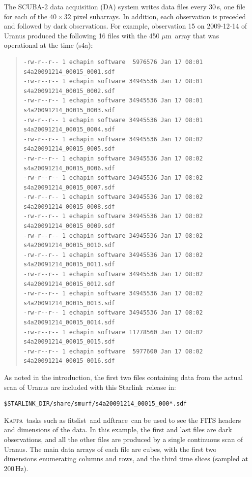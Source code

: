 \documentclass[twoside,11pt]{article}
\newcommand{\micron}{\mbox{\,${\mu}$m}}            %
\newenvironment{myquote}{\begin{quote}\begin{small}}{\end{small}\end{quote}}
\newcommand{\starlink}{\htmladdnormallink{Starlink}{http://starlink.jach.hawaii.edu}}
\newcommand{\Kappa}{\xref{\textsc{Kappa}}{sun95}{}}
\newcommand{\task}[1]{\textsf{#1}}
\newcommand{\fitslist}{\xref{\task{fitslist}}{sun95}{FITSLIST}}
\newcommand{\ndftrace}{\xref{\task{ndftrace}}{sun95}{NDFTRACE}}
\newcommand{\htmladdnormallink}[2]{#1}
\newcommand{\xref}[3]{#1}
\renewcommand{\_}{\texttt{\symbol{95}}}
\begin{document}
The SCUBA-2 data acquisition (DA) system writes data files every
30\,s, one file for each of the $40\times32$ pixel subarrays. In
addition, each observation is preceded and followed by dark
observations. For example, observation 15 on 2009-12-14 of Uranus
produced the following 16 files with the 450\,\micron\ array that was
operational at the time (s4a):

\begin{myquote}
\begin{verbatim}
-rw-r--r-- 1 echapin software  5976576 Jan 17 08:01 s4a20091214_00015_0001.sdf
-rw-r--r-- 1 echapin software 34945536 Jan 17 08:01 s4a20091214_00015_0002.sdf
-rw-r--r-- 1 echapin software 34945536 Jan 17 08:01 s4a20091214_00015_0003.sdf
-rw-r--r-- 1 echapin software 34945536 Jan 17 08:01 s4a20091214_00015_0004.sdf
-rw-r--r-- 1 echapin software 34945536 Jan 17 08:02 s4a20091214_00015_0005.sdf
-rw-r--r-- 1 echapin software 34945536 Jan 17 08:02 s4a20091214_00015_0006.sdf
-rw-r--r-- 1 echapin software 34945536 Jan 17 08:02 s4a20091214_00015_0007.sdf
-rw-r--r-- 1 echapin software 34945536 Jan 17 08:02 s4a20091214_00015_0008.sdf
-rw-r--r-- 1 echapin software 34945536 Jan 17 08:02 s4a20091214_00015_0009.sdf
-rw-r--r-- 1 echapin software 34945536 Jan 17 08:02 s4a20091214_00015_0010.sdf
-rw-r--r-- 1 echapin software 34945536 Jan 17 08:02 s4a20091214_00015_0011.sdf
-rw-r--r-- 1 echapin software 34945536 Jan 17 08:02 s4a20091214_00015_0012.sdf
-rw-r--r-- 1 echapin software 34945536 Jan 17 08:02 s4a20091214_00015_0013.sdf
-rw-r--r-- 1 echapin software 34945536 Jan 17 08:02 s4a20091214_00015_0014.sdf
-rw-r--r-- 1 echapin software 11778560 Jan 17 08:02 s4a20091214_00015_0015.sdf
-rw-r--r-- 1 echapin software  5977600 Jan 17 08:02 s4a20091214_00015_0016.sdf
\end{verbatim}
\end{myquote}

As noted in the introduction, the first two files containing data from
the actual scan of Uranus are included with this \starlink\ release in:
\begin{verbatim}
$STARLINK_DIR/share/smurf/s4a20091214_00015_000*.sdf
\end{verbatim}

\Kappa\ tasks such as \fitslist\ and \ndftrace\ can be used to see the
FITS headers and dimensions of the data. In this example, the first
and last files are dark observations, and all the other files are
produced by a single continuous scan of Uranus. The main data arrays
of each file are cubes, with the first two dimensions enumerating
columns and rows, and the third time slices (sampled at 200\,Hz).
\end{document}
